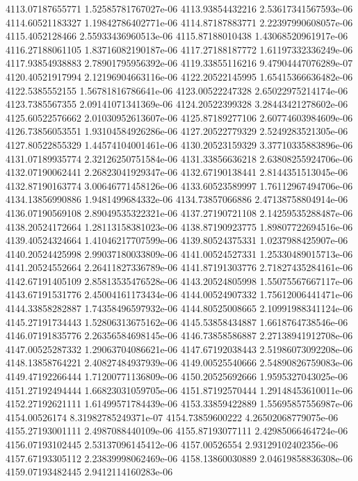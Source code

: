 {4113.07187655771 1.52585781767027e-06
4113.93854432216 2.53617341567593e-06
4114.60521183327 1.19842786402771e-06
4114.87187883771 2.22397990608057e-06
4115.4052128466 2.55933436960513e-06
4115.87188010438 1.43068520961917e-06
4116.27188061105 1.83716082190187e-06
4117.27188187772 1.61197332336249e-06
4117.93854938883 2.78901795956392e-06
4119.33855116216 9.47904447076289e-07
4120.40521917994 2.12196904663116e-06
4122.20522145995 1.65415366636482e-06
4122.5385552155 1.56781816786641e-06
4123.00522247328 2.65022975214174e-06
4123.7385567355 2.09141071341369e-06
4124.20522399328 3.28443421278602e-06
4125.60522576662 2.01030952613607e-06
4125.87189277106 2.60774603984609e-06
4126.73856053551 1.93104584926286e-06
4127.20522779329 2.5249283521305e-06
4127.80522855329 1.44574104001461e-06
4130.20523159329 3.37710335883896e-06
4131.07189935774 2.32126250751584e-06
4131.33856636218 2.63808255924706e-06
4132.07190062441 2.26823041929347e-06
4132.67190138441 2.8144351513045e-06
4132.87190163774 3.00646771458126e-06
4133.60523589997 1.76112967494706e-06
4134.13856990886 1.9481499684332e-06
4134.73857066886 2.47138758804914e-06
4136.07190569108 2.89049535322321e-06
4137.27190721108 2.14259535288487e-06
4138.20524172664 1.28113158381023e-06
4138.87190923775 1.89807722694516e-06
4139.40524324664 1.41046217707599e-06
4139.80524375331 1.0237988425907e-06
4140.20524425998 2.99037180033809e-06
4141.00524527331 1.25330489015713e-06
4141.20524552664 2.26411827336789e-06
4141.87191303776 2.71827435284161e-06
4142.67191405109 2.85813535476528e-06
4143.20524805998 1.55075567667117e-06
4143.67191531776 2.45004161173434e-06
4144.00524907332 1.75612006441471e-06
4144.33858282887 1.74358496597932e-06
4144.80525008665 2.10991988341124e-06
4145.27191734443 1.52806313675162e-06
4145.53858434887 1.6618764738546e-06
4146.07191835776 2.26356584698145e-06
4146.73858586887 2.27138941912708e-06
4147.00525287332 1.29063704086621e-06
4147.67192038443 2.51986073092208e-06
4148.13858764221 2.40827484937939e-06
4149.00525540666 2.54890826759083e-06
4149.47192266444 1.71200771136809e-06
4150.20525692666 1.9595327043025e-06
4151.27192494444 1.66823031059705e-06
4151.87192570444 1.29148453610011e-06
4152.27192621111 1.61499571784439e-06
4153.33859422889 1.55695857556987e-06
4154.00526174 8.31982785249371e-07
4154.73859600222 4.26502068779075e-06
4155.27193001111 2.4987088440109e-06
4155.87193077111 2.42985066464724e-06
4156.07193102445 2.53137096145412e-06
4157.00526554 2.93129102402356e-06
4157.67193305112 2.23839998062469e-06
4158.13860030889 2.04619858836308e-06
4159.07193482445 2.9412114160283e-06
}
